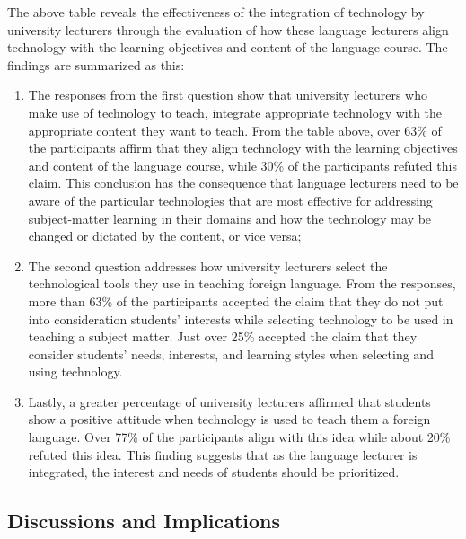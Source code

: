 \documentclass[english]{textolivre}
\begin{document}
The above table reveals the effectiveness of the integration of technology by university lecturers through the evaluation of how these language lecturers align technology with the learning objectives and content of the language course. The findings are summarized as this:

\begin{enumerate}
    \item The responses from the first question show that university lecturers who make use of technology to teach, integrate appropriate technology with the appropriate content they want to teach. From the table above, over 63\% of the participants affirm that they align technology with the learning objectives and content of the language course, while 30\% of the participants refuted this claim. This conclusion has the consequence that language lecturers need to be aware of the particular technologies that are most effective for addressing subject-matter learning in their domains and how the technology may be changed or dictated by the content, or vice versa;
    \item The second question addresses how university lecturers select the technological tools they use in teaching foreign language. From the responses, more than 63\% of the participants accepted the claim that they do not put into consideration students’ interests while selecting technology to be used in teaching a subject matter. Just over 25\% accepted the claim that they consider students’ needs, interests, and learning styles when selecting and using technology.
    \item Lastly, a greater percentage of university lecturers affirmed that students show a positive attitude when technology is used to teach them a foreign language. Over 77\% of the participants align with this idea while about 20\% refuted this idea. This finding suggests that as the language lecturer is integrated, the interest and needs of students should be prioritized.
\end{enumerate}

\subsection{Discussions and Implications}
\end{document}
